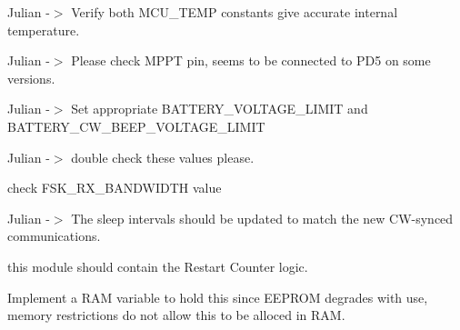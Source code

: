 
\begin{DoxyRefList}
\item[\label{todo__todo000003}%
\Hypertarget{todo__todo000003}%
Module \hyperlink{group__defines__mcu__temperature__configuration}{defines\+\_\+mcu\+\_\+temperature\+\_\+configuration} ]Julian -\/$>$ Verify both M\+C\+U\+\_\+\+T\+E\+MP constants give accurate internal temperature. 
\item[\label{todo__todo000002}%
\Hypertarget{todo__todo000002}%
Module \hyperlink{group__defines__pin__map}{defines\+\_\+pin\+\_\+map} ]Julian -\/$>$ Please check M\+P\+PT pin, seems to be connected to P\+D5 on some versions. 
\item[\label{todo__todo000001}%
\Hypertarget{todo__todo000001}%
Module \hyperlink{group__defines__power__management__configuration}{defines\+\_\+power\+\_\+management\+\_\+configuration} ]Julian -\/$>$ Set appropriate B\+A\+T\+T\+E\+R\+Y\+\_\+\+V\+O\+L\+T\+A\+G\+E\+\_\+\+L\+I\+M\+IT and B\+A\+T\+T\+E\+R\+Y\+\_\+\+C\+W\+\_\+\+B\+E\+E\+P\+\_\+\+V\+O\+L\+T\+A\+G\+E\+\_\+\+L\+I\+M\+IT 
\item[\label{todo__todo000004}%
\Hypertarget{todo__todo000004}%
Module \hyperlink{group__defines__radio__lora__configuration}{defines\+\_\+radio\+\_\+lora\+\_\+configuration} ]Julian -\/$>$ double check these values please.  
\item[\label{todo__todo000005}%
\Hypertarget{todo__todo000005}%
Module \hyperlink{group__defines__radio__non__ism__band__fsk__configuraiton}{defines\+\_\+radio\+\_\+non\+\_\+ism\+\_\+band\+\_\+fsk\+\_\+configuraiton} ]check F\+S\+K\+\_\+\+R\+X\+\_\+\+B\+A\+N\+D\+W\+I\+D\+TH value 
\item[\label{todo__todo000006}%
\Hypertarget{todo__todo000006}%
Global \hyperlink{power__control_8h_aa26e5dcfde1aecf602a3a41ef6e205b8}{Power\+\_\+\+Control\+\_\+\+Get\+\_\+\+Sleep\+\_\+\+Interval} ()]Julian -\/$>$ The sleep intervals should be updated to match the new C\+W-\/synced communications. 
\item[\label{todo__todo000007}%
\Hypertarget{todo__todo000007}%
File \hyperlink{system__info_8h}{system\+\_\+info.h} ]this module should contain the Restart Counter logic.  
\item[\label{todo__todo000008}%
\Hypertarget{todo__todo000008}%
Global \hyperlink{system__info_8h_a4ba2aee682a65d201b020b7fcf20939c}{System\+\_\+\+Info\+\_\+\+Get\+\_\+\+Callsign} (char $\ast$buff, uint8\+\_\+t len)]Implement a R\+AM variable to hold this since E\+E\+P\+R\+OM degrades with use, memory restrictions do not allow this to be alloced in R\+AM.
\end{DoxyRefList}